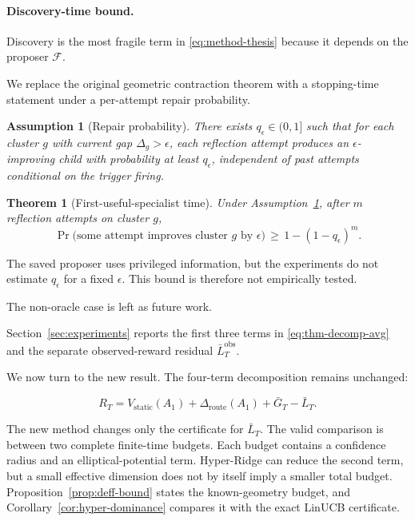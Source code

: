 \documentclass{article} %
\newtheorem{theorem}{Theorem}
\newtheorem{assumption}{Assumption}
\providecommand{\Rstatic}{V_{\mathrm{static}}}
\providecommand{\Droute}{\Delta_{\mathrm{route}}}
\begin{document}
\paragraph{Discovery-time bound.}

\label{sec:method-specialist}

Discovery is the most fragile term in \eqref{eq:method-thesis} because it depends on the proposer $\mathcal{F}$.

We replace the original geometric contraction theorem with a stopping-time statement under a per-attempt repair probability.

\begin{assumption}[Repair probability]
\label{ass:repair}
There exists $q_\epsilon \in (0,1]$ such that for each cluster $g$ with current gap $\Delta_g > \epsilon$, each reflection attempt produces an $\epsilon$-improving child with probability at least $q_\epsilon$, independent of past attempts conditional on the trigger firing.
\end{assumption}

\begin{theorem}[First-useful-specialist time]
\label{thm:specialist}
Under Assumption~\ref{ass:repair}, after $m$ reflection attempts on cluster $g$,
\begin{equation}
\label{eq:thm-specialist}
\Pr\bigl(\text{some attempt improves cluster } g \text{ by } \epsilon\bigr) \,\ge\, 1 - (1 - q_\epsilon)^m.
\end{equation}
\end{theorem}

The saved proposer uses privileged information, but the experiments do not
estimate \(q_\epsilon\) for a fixed \(\epsilon\). This bound is therefore not
empirically tested.

The non-oracle case is left as future work.

Section~\ref{sec:experiments} reports the first three terms in
\eqref{eq:thm-decomp-avg} and the separate observed-reward residual
\(\bar L_T^{\mathrm{obs}}\).

\label{sec:theory}

We now turn to the new result. The four-term decomposition remains unchanged:

\[
R_T = \Rstatic(A_1) + \Droute(A_1) + \bar{G}_T - \bar{L}_T .
\]

The new method changes only the certificate for $\bar L_T$. The valid
comparison is between two complete finite-time budgets. Each budget contains a
confidence radius and an elliptical-potential term. Hyper-Ridge can reduce the
second term, but a small effective dimension does not by itself imply a smaller
total budget. Proposition~\ref{prop:deff-bound} states the known-geometry
budget, and Corollary~\ref{cor:hyper-dominance} compares it with the exact
LinUCB certificate.
\end{document}
